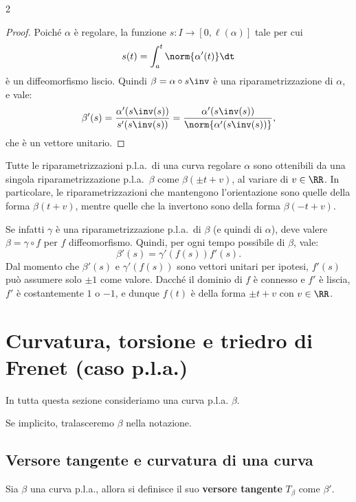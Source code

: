 \begin{multicols*}{2}
    \begin{proof}
        Poiché $\alpha$ è regolare, la funzione $s : I \to [0, \ell(\alpha)]$ tale per cui
        \[ s(t) = \int_{a}^t \norm{\alpha'(t)} \dt \]
        è un diffeomorfismo liscio. Quindi $\beta = \alpha \circ s\inv$ è una riparametrizzazione
        di $\alpha$, e vale:
        \[
            \beta'(s) = \frac{\alpha'(s\inv(s))}{s'(s\inv(s))} = \frac{\alpha'(s\inv(s))}{\norm{\alpha'(s\inv(s))}},
        \]
        che è un vettore unitario.
    \end{proof}

    \begin{remark}
        Tutte le riparametrizzazioni p.l.a.~di una curva regolare $\alpha$ sono ottenibili da una
        singola riparametrizzazione p.l.a.~$\beta$ come $\beta(\pm t + v)$, al variare di $v \in \RR$.
        In particolare, le riparametrizzazioni che mantengono l'orientazione sono quelle della forma
        $\beta(t + v)$, mentre quelle che la invertono sono della forma $\beta(-t + v)$. \medskip

        Se infatti $\gamma$ è una riparametrizzazione p.l.a.~di $\beta$ (e quindi di $\alpha$), deve valere
        $\beta = \gamma \circ f$ per $f$ diffeomorfismo. Quindi, per ogni tempo possibile di $\beta$, vale:
        \[ \beta'(s) = \gamma'(f(s)) f'(s). \]
        Dal momento che $\beta'(s)$ e $\gamma'(f(s))$ sono vettori unitari per ipotesi, $f'(s)$ può assumere
        solo $\pm 1$ come valore.
        Dacché il dominio di $f$ è connesso e $f'$ è liscia, $f'$ è costantemente $1$ o $-1$, e dunque
        $f(t)$ è della forma $\pm t + v$ con $v \in \RR$.
    \end{remark}

    \section{Curvatura, torsione e triedro di Frenet (caso p.l.a.)}

    In tutta questa sezione consideriamo una curva p.l.a. $\beta$. \smallskip

    Se implicito, tralasceremo $\beta$ nella notazione.

    \subsection{Versore tangente e curvatura di una curva}

    \begin{definition}
        Sia $\beta$ una curva p.l.a., allora si definisce il
        suo \textbf{versore tangente} $T_\beta$ come $\beta'$.
    \end{definition}


\end{multicols*}
